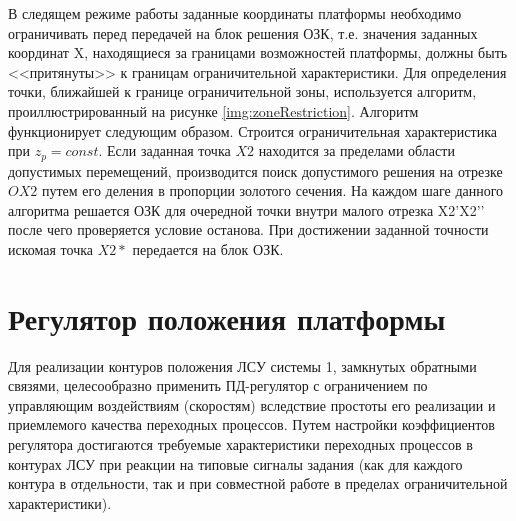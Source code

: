 В следящем режиме работы заданные координаты платформы необходимо ограничивать перед передачей на блок решения ОЗК, т.е. значения заданных координат X, находящиеся за границами возможностей платформы, должны быть <<притянуты>> к границам ограничительной характеристики. Для определения точки, ближайшей к границе ограничительной зоны, используется алгоритм, проиллюстрированный на рисунке \ref{img:zoneRestriction}.
	Алгоритм функционирует следующим образом. Строится ограничительная характеристика при $z_p = const$. Если заданная точка $X2$ находится за пределами области допустимых перемещений, производится поиск допустимого решения на отрезке $OX2$ путем его деления в пропорции золотого сечения. На каждом шаге данного алгоритма решается ОЗК для очередной точки внутри малого отрезка X2’X2’’ после чего проверяется условие останова. При достижении заданной точности искомая точка $X2*$ передается на блок ОЗК.

\section{Регулятор положения платформы} \label{sect4_3}

Для реализации контуров положения ЛСУ системы 1, замкнутых обратными связями, целесообразно применить ПД-регулятор с ограничением по управляющим воздействиям (скоростям) вследствие простоты его реализации и приемлемого качества переходных процессов. Путем настройки коэффициентов регулятора \cite{Plohotnikov, Voevoda} достигаются требуемые характеристики переходных процессов в контурах ЛСУ при реакции на типовые сигналы задания \cite{ChLewin} (как для каждого контура в отдельности, так и при совместной работе в пределах ограничительной характеристики).

